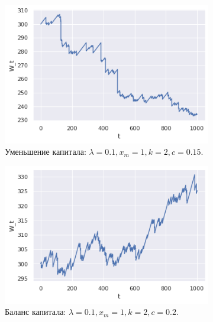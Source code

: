 \begin{figure}[ht]
    \centering
    \begin{subfigure}[b]{0.49\textwidth}
        \centering
        \includegraphics[width=\textwidth]{./resources/ins_comp_decreasing.png}
        \caption{Уменьшение капитала: $\lambda = 0.1, x_m = 1, k = 2, c = 0.15. $}
        \label{subfig:ins_comp_decreasing}
    \end{subfigure}
    \hfill
    \begin{subfigure}[b]{0.49\textwidth}
        \centering
        \includegraphics[width=\textwidth]{./resources/ins_comp_balancing.png}
        \caption{Баланс капитала: $\lambda = 0.1, x_m = 1, k = 2, c = 0.2. $}
        \label{subfig:ins_comp_balancing}
    \end{subfigure}
    \hfill
    \begin{subfigure}[b]{0.49\textwidth}

\end{subfigure}
\end{figure}

